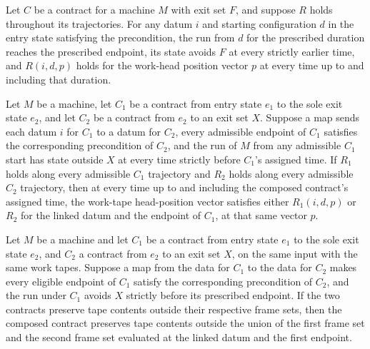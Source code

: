 \begin{theorem}
\label{Turing.Contract.Traj.segment}
\leanok
{}
Let $C$ be a contract for a machine $M$ with exit set $F$, and suppose $R$ holds
throughout its trajectories. For any datum $i$ and starting configuration $d$ in the
entry state satisfying the precondition, the run from $d$ for the prescribed duration
reaches the prescribed endpoint, its state avoids $F$ at every strictly earlier time,
and $R(i,d,p)$ holds for the work-head position vector $p$ at every time up to and
including that duration.
\end{theorem}

\begin{theorem}
\label{Turing.Contract.Traj.trans}
\leanok
{}
Let $M$ be a machine, let $C_1$ be a contract from entry state $e_1$ to the sole exit
state $e_2$, and let $C_2$ be a contract from $e_2$ to an exit set $X$. Suppose a map
sends each datum $i$ for $C_1$ to a datum for $C_2$, every admissible endpoint of $C_1$
satisfies the corresponding precondition of $C_2$, and the run of $M$ from any
admissible $C_1$ start has state outside $X$ at every time strictly before $C_1$'s
assigned time. If $R_1$ holds along every admissible $C_1$ trajectory and $R_2$ holds
along every admissible $C_2$ trajectory, then at every time up to and including the
composed contract's assigned time, the work-tape head-position vector satisfies either
$R_1(i,d,p)$ or $R_2$ for the linked datum and the endpoint of $C_1$, at that same
vector $p$.
\end{theorem}

\begin{theorem}
\label{Turing.Contract.Frames.trans}
\leanok
{}
Let $M$ be a machine and let $C_1$ be a contract from entry state $e_1$ to the sole exit
state $e_2$, and $C_2$ a contract from $e_2$ to an exit set $X$, on the same input with
the same work tapes. Suppose a map from the data for $C_1$ to the data for $C_2$ makes
every eligible endpoint of $C_1$ satisfy the corresponding precondition of $C_2$, and
the run under $C_1$ avoids $X$ strictly before its prescribed endpoint. If the two
contracts preserve tape contents outside their respective frame sets, then the composed
contract preserves tape contents outside the union of the first frame set and the second
frame set evaluated at the linked datum and the first endpoint.
\end{theorem}

